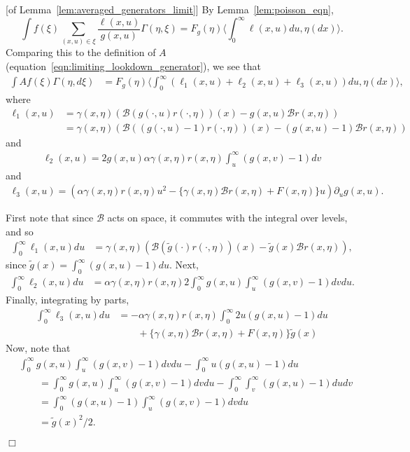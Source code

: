 \documentclass[12pt]{article}
\newenvironment {proof}{{\noindent\bf Proof }}{\hfill $\Box$ \medskip}
\newcommand{\DG}{\mathcal{B}}  %
\newcommand{\lp}{\xi}              %
\numberwithin{equation}{section}
\begin{document}
\begin{proof}[of Lemma~\ref{lem:averaged_generators_limit}]
By Lemma~\ref{lem:poisson_eqn},
$$
    \int f(\lp) \sum_{(x,u)\in\lp} \frac{\ell(x,u)}{g(x,u)} \Gamma(\eta, \lp)
    =
    F_g(\eta) \bigg\langle \int_0^\infty \ell(x,u) du , \eta(dx) \bigg\rangle .
$$
Comparing this to the definition of $A$
(equation~\eqref{eqn:limiting_lookdown_generator}),
we see that
\begin{align*}
    \int Af(\lp) \Gamma(\eta,d\lp)
    &=
    F_g(\eta) \bigg\langle
        \int_0^\infty
        (\ell_1(x,u) + \ell_2(x,u) + \ell_3(x,u))
        du, \eta(dx)
    \bigg\rangle ,
\end{align*}
where
\begin{align*}
    \ell_1(x,u)
    &=
    \gamma(x,\eta)\left(
        \DG(g(\cdot,u) r(\cdot,\eta))(x) - g(x,u) \DG r(x,\eta)
    \right) \\
    &=
    \gamma(x,\eta)\left(
        \DG((g(\cdot,u)-1) r(\cdot,\eta))(x) - (g(x,u)-1) \DG r(x,\eta)
    \right)
\end{align*}
and
\begin{align*}
    \ell_2(x,u)
    =
    2 g(x,u) \alpha \gamma(x,\eta) r(x,\eta) \int_u^\infty(g(x,v) - 1)dv
\end{align*}
and
\begin{align*}
    \ell_3(x,u)
    =
    \left( \alpha \gamma(x,\eta)r(x,\eta)u^2 - \{\gamma(x,\eta)\DG r(x,\eta) + F(x,\eta)\} u \right)
    \partial_u g(x,u) .
\end{align*}

First note that since $\DG$ acts on space, it commutes with the integral over levels, and so
\begin{align*}
    \int_0^\infty \ell_1(x,u) du
    &=
    \gamma(x,\eta)\left(
        \DG(\widetilde{g}(\cdot) r(\cdot,\eta))(x) - \widetilde{g}(x) \DG r(x,\eta)
    \right) ,
\end{align*}
since $\widetilde{g}(x) = \int_0^\infty (g(x,u) - 1) du$.
Next,
\begin{align*}
    \int_0^\infty \ell_2(x,u) du
    &=
    \alpha \gamma(x,\eta) r(x,\eta) 2\int_0^\infty g(x,u) \int_u^\infty (g(x,v)-1) dv du .
\end{align*}
Finally, integrating by parts,
\begin{align*}
    \int_0^\infty \ell_3(x,u) du
    &=
    - \alpha \gamma(x,\eta) r(x,\eta) \int_0^\infty 2u(g(x,u) - 1) du
    \\ & \qquad {}
    + \{ \gamma(x,\eta) \DG r(x,\eta) + F(x,\eta) \} \widetilde{g}(x)
\end{align*}
Now, note that
\begin{align*}
&
    \int_0^\infty g(x,u) \int_u^\infty (g(x,v)-1) dv du - \int_0^\infty u(g(x,u)-1)du
\\ & \qquad =
    \int_0^\infty g(x,u) \int_u^\infty (g(x,v)-1) dv du - \int_0^\infty \int_v^\infty (g(x,u) -1) du dv
\\ & \qquad =
    \int_0^\infty (g(x,u)-1) \int_u^\infty (g(x,v)-1) dv du
\\ & \qquad =
    \widetilde{g}(x)^2/2 .
\end{align*}


\end{proof}
\end{document}
